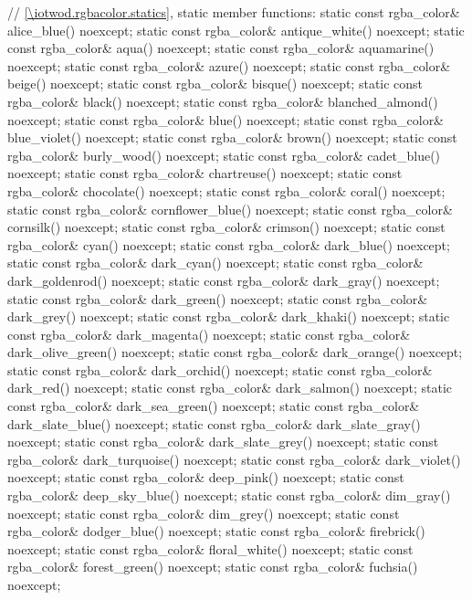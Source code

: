 \begin{codeblock}
{{    // \ref{\iotwod.rgbacolor.statics}, static member functions:
    static const rgba_color& alice_blue() noexcept;
    static const rgba_color& antique_white() noexcept;
    static const rgba_color& aqua() noexcept;
    static const rgba_color& aquamarine() noexcept;
    static const rgba_color& azure() noexcept;
    static const rgba_color& beige() noexcept;
    static const rgba_color& bisque() noexcept;
    static const rgba_color& black() noexcept;
    static const rgba_color& blanched_almond() noexcept;
    static const rgba_color& blue() noexcept;
    static const rgba_color& blue_violet() noexcept;
    static const rgba_color& brown() noexcept;
    static const rgba_color& burly_wood() noexcept;
    static const rgba_color& cadet_blue() noexcept;
    static const rgba_color& chartreuse() noexcept;
    static const rgba_color& chocolate() noexcept;
    static const rgba_color& coral() noexcept;
    static const rgba_color& cornflower_blue() noexcept;
    static const rgba_color& cornsilk() noexcept;
    static const rgba_color& crimson() noexcept;
    static const rgba_color& cyan() noexcept;
    static const rgba_color& dark_blue() noexcept;
    static const rgba_color& dark_cyan() noexcept;
    static const rgba_color& dark_goldenrod() noexcept;
    static const rgba_color& dark_gray() noexcept;
    static const rgba_color& dark_green() noexcept;
    static const rgba_color& dark_grey() noexcept;
    static const rgba_color& dark_khaki() noexcept;
    static const rgba_color& dark_magenta() noexcept;
    static const rgba_color& dark_olive_green() noexcept;
    static const rgba_color& dark_orange() noexcept;
    static const rgba_color& dark_orchid() noexcept;
    static const rgba_color& dark_red() noexcept;
    static const rgba_color& dark_salmon() noexcept;
    static const rgba_color& dark_sea_green() noexcept;
    static const rgba_color& dark_slate_blue() noexcept;
    static const rgba_color& dark_slate_gray() noexcept;
    static const rgba_color& dark_slate_grey() noexcept;
    static const rgba_color& dark_turquoise() noexcept;
    static const rgba_color& dark_violet() noexcept;
    static const rgba_color& deep_pink() noexcept;
    static const rgba_color& deep_sky_blue() noexcept;
    static const rgba_color& dim_gray() noexcept;
    static const rgba_color& dim_grey() noexcept;
    static const rgba_color& dodger_blue() noexcept;
    static const rgba_color& firebrick() noexcept;
    static const rgba_color& floral_white() noexcept;
    static const rgba_color& forest_green() noexcept;
    static const rgba_color& fuchsia() noexcept;
}}
\end{codeblock}
